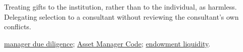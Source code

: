 \begin{qfmethod}
 Treating gifts to the institution, rather than to the individual, as harmless. Delegating selection to a consultant without reviewing the consultant's own conflicts.

 \hyperref[meth:manager-due-diligence]{manager due diligence}; \hyperref[def:asset-manager-code]{Asset Manager Code}; \hyperref[meth:endowment-liquidity-allocation]{endowment liquidity}.

\end{qfmethod}
